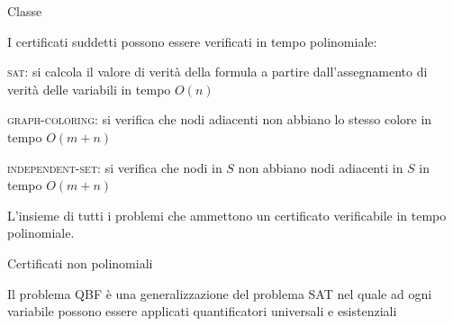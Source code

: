 \begin{frame}{Classe \NP}

I certificati suddetti possono essere verificati in tempo polinomiale:
\BIL
\item \textsc{sat}: si calcola il valore di verità della formula a partire dall'assegnamento di verità delle variabili in tempo $O(n)$
\item \textsc{graph-coloring}: si verifica che nodi adiacenti non abbiano lo stesso
colore in tempo $O(m+n)$
\item \textsc{independent-set}: si verifica che nodi in $S$ non abbiano nodi
adiacenti in $S$ in tempo $O(m+n)$
\EIL

\begin{myboxtitle}[Classe \NP]
L'insieme di tutti i problemi che ammettono un certificato verificabile
in tempo polinomiale.    
\end{myboxtitle}

\end{frame}



\begin{frame}{Certificati non polinomiali}

\vspace{-9pt}
\begin{myboxtitle}
Il problema QBF è una generalizzazione del problema SAT nel quale ad ogni variabile possono essere applicati quantificatori universali e esistenziali
\end{myboxtitle}

\vspace{-3pt}
\end{frame}

